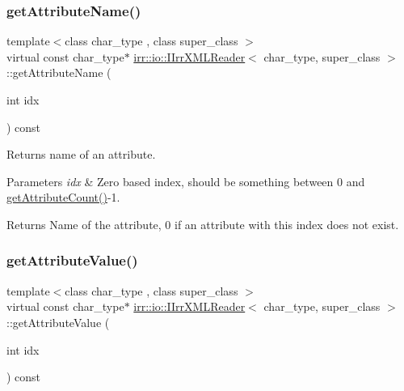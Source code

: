 \subsubsection{\texorpdfstring{get\+Attribute\+Name()}{getAttributeName()}\hspace{0.1cm}{\footnotesize\ttfamily [2/2]}}
{\footnotesize\ttfamily template$<$class char\+\_\+type , class super\+\_\+class $>$ \\
virtual const char\+\_\+type$\ast$ \hyperlink{classirr_1_1io_1_1IIrrXMLReader}{irr\+::io\+::\+I\+Irr\+X\+M\+L\+Reader}$<$ char\+\_\+type, super\+\_\+class $>$\+::get\+Attribute\+Name (\begin{DoxyParamCaption}\item[{int}]{idx }\end{DoxyParamCaption}) const\hspace{0.3cm}{\ttfamily [pure virtual]}}



Returns name of an attribute. 


\begin{DoxyParams}{Parameters}
{\em idx} & Zero based index, should be something between 0 and \hyperlink{classirr_1_1io_1_1IIrrXMLReader_a8f85253d2efb15061facdb9571b9c549}{get\+Attribute\+Count()}-\/1. \\
\hline
\end{DoxyParams}
\begin{DoxyReturn}{Returns}
Name of the attribute, 0 if an attribute with this index does not exist. 
\end{DoxyReturn}
\mbox{\label{classirr_1_1io_1_1IIrrXMLReader_a41bd71a1b9d4a80cd1d0257dedb35325}} 
\subsubsection{\texorpdfstring{get\+Attribute\+Value()}{getAttributeValue()}\hspace{0.1cm}{\footnotesize\ttfamily [1/4]}}
{\footnotesize\ttfamily template$<$class char\+\_\+type , class super\+\_\+class $>$ \\
virtual const char\+\_\+type$\ast$ \hyperlink{classirr_1_1io_1_1IIrrXMLReader}{irr\+::io\+::\+I\+Irr\+X\+M\+L\+Reader}$<$ char\+\_\+type, super\+\_\+class $>$\+::get\+Attribute\+Value (\begin{DoxyParamCaption}\item[{int}]{idx }\end{DoxyParamCaption}) const\hspace{0.3cm}{\ttfamily [pure virtual]}}



